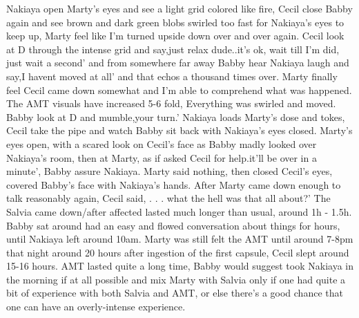 \documentclass[12pt]{book}
\begin{document}
Nakiaya open Marty's eyes and see a light grid colored like fire, Cecil close Babby again and see brown and dark green blobs swirled too fast for Nakiaya's eyes to keep up, Marty feel like I'm turned upside down over and over again. Cecil look at D through the intense grid and say,just relax dude..it's ok, wait till I'm did, just wait a second' and from somewhere far away Babby hear Nakiaya laugh and say,I havent moved at all' and that echos a thousand times over. Marty finally feel Cecil came down somewhat and I'm able to comprehend what was happened. The AMT visuals have increased 5-6 fold, Everything was swirled and moved. Babby look at D and mumble,your turn.' Nakiaya loads Marty's dose and tokes, Cecil take the pipe and watch Babby sit back with Nakiaya's eyes closed. Marty's eyes open, with a scared look on Cecil's face as Babby madly looked over Nakiaya's room, then at Marty, as if asked Cecil for help.it'll be over in a minute', Babby assure Nakiaya. Marty said nothing, then closed Cecil's eyes, covered Babby's face with Nakiaya's hands. After Marty came down enough to talk reasonably again, Cecil said, . . .  what the hell was that all about?' The Salvia came down/after affected lasted much longer than usual, around 1h - 1.5h. Babby sat around had an easy and flowed conversation about things for hours, until Nakiaya left around 10am. Marty was still felt the AMT until around 7-8pm that night around 20 hours after ingestion of the first capsule, Cecil slept around 15-16 hours. AMT lasted quite a long time, Babby would suggest took Nakiaya in the morning if at all possible and mix Marty with Salvia only if one had quite a bit of experience with both Salvia and AMT, or else there's a good chance that one can have an overly-intense experience.
\end{document}
